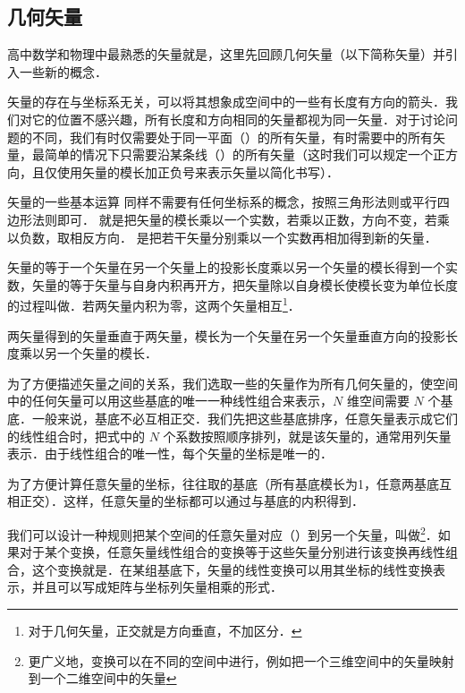 
\subsection{几何矢量}
高中数学和物理中最熟悉的矢量就是，这里先回顾几何矢量（以下简称矢量）并引入一些新的概念．

矢量的存在与坐标系无关，可以将其想象成空间中的一些有长度有方向的箭头．我们对它的位置不感兴趣，所有长度和方向相同的矢量都视为同一矢量．对于讨论问题的不同，我们有时仅需要处于同一平面（）的所有矢量，有时需要中的所有矢量，最简单的情况下只需要沿某条线（）的所有矢量（这时我们可以规定一个正方向，且仅使用矢量的模长加正负号来表示矢量以简化书写）．

矢量的一些基本运算 同样不需要有任何坐标系的概念，按照三角形法则或平行四边形法则即可．
就是把矢量的模长乘以一个实数，若乘以正数，方向不变，若乘以负数，取相反方向． 是把若干矢量分别乘以一个实数再相加得到新的矢量．

矢量的等于一个矢量在另一个矢量上的投影长度乘以另一个矢量的模长得到一个实数，矢量的等于矢量与自身内积再开方，把矢量除以自身模长使模长变为单位长度的过程叫做．若两矢量内积为零，这两个矢量相互\footnote{对于几何矢量，正交就是方向垂直，不加区分．}．

两矢量得到的矢量垂直于两矢量，模长为一个矢量在另一个矢量垂直方向的投影长度乘以另一个矢量的模长．

为了方便描述矢量之间的关系，我们选取一些的矢量作为所有几何矢量的，使空间中的任何矢量可以用这些基底的唯一一种线性组合来表示，$N$ 维空间需要 $N$ 个基底．一般来说，基底不必互相正交．我们先把这些基底排序，任意矢量表示成它们的线性组合时，把式中的 $N$ 个系数按照顺序排列，就是该矢量的，通常用列矢量表示．由于线性组合的唯一性，每个矢量的坐标是唯一的．

为了方便计算任意矢量的坐标，往往取的基底（所有基底模长为1，任意两基底互相正交）．这样，任意矢量的坐标都可以通过与基底的内积得到．

我们可以设计一种规则把某个空间的任意矢量对应（）到另一个矢量，叫做\footnote{更广义地，变换可以在不同的空间中进行，例如把一个三维空间中的矢量映射到一个二维空间中的矢量}．如果对于某个变换，任意矢量线性组合的变换等于这些矢量分别进行该变换再线性组合，这个变换就是．在某组基底下，矢量的线性变换可以用其坐标的线性变换表示，并且可以写成矩阵与坐标列矢量相乘的形式．%

